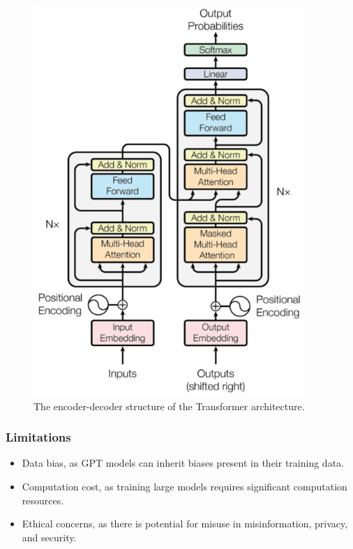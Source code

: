 \documentclass[11pt]{article}
\begin{document}
\begin{figure}[htbp]
\centering
\includegraphics[height=40em]{./images/encoder-decoder-transformer-structure.png}
\caption{The encoder-decoder structure of the Transformer architecture.}
\end{figure}

 \newpage
\subsubsection{Limitations}
\label{sec:orgadf5876}
\begin{itemize}
\item Data bias, as GPT models can inherit biases present in their training data.
\item Computation cost, as training large models requires significant computation resources.
\item Ethical concerns, as there is potential for misuse in misinformation, privacy, and security.
\end{itemize}
\end{document}
